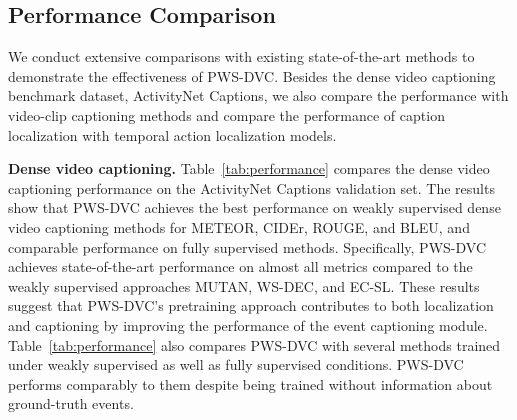 \subsection{Performance Comparison}
We conduct extensive comparisons with existing state-of-the-art methods to demonstrate the effectiveness of PWS-DVC. Besides the dense video captioning benchmark dataset, ActivityNet Captions, we also compare the performance with video-clip captioning methods and compare the performance of caption localization with temporal action localization models.

\textbf{Dense video captioning.}
Table~\ref{tab:performance} compares the dense video captioning performance on the ActivityNet Captions validation set.
The results show that PWS-DVC achieves the best performance on weakly supervised dense video captioning methods for METEOR, CIDEr, ROUGE, and BLEU, and comparable performance on fully supervised methods.
Specifically, PWS-DVC achieves state-of-the-art performance on almost all metrics compared to the weakly supervised approaches MUTAN, WS-DEC, and EC-SL.
These results suggest that PWS-DVC's pretraining approach contributes to both localization and captioning by improving the performance of the event captioning module.
Table~\ref{tab:performance} also compares PWS-DVC with several methods trained under weakly supervised as well as fully supervised conditions.
PWS-DVC performs comparably to them despite being trained without information about ground-truth events.

